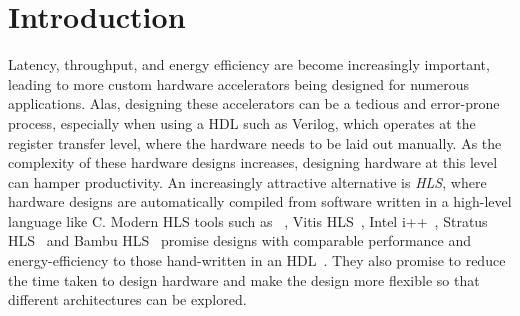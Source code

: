 \chapter{Introduction}%
\label{sec:introduction}




Latency, throughput, and energy efficiency are become increasingly important,
leading to more custom hardware accelerators being designed for numerous
applications.  Alas, designing these accelerators can be a tedious and
error-prone process, especially when using a \gls{HDL} such as Verilog, which
operates at the register transfer level, where the hardware needs to be laid out
manually.  As the complexity of these hardware designs increases, designing
hardware at this level can hamper productivity.  An increasingly attractive
alternative is \emph{\gls{HLS}}, where hardware designs are automatically
compiled from software written in a high-level language like C.  Modern
\gls{HLS} tools such as \legup{}~\cite{canis11_legup}, Vitis
HLS~\cite{amd23_vitis_high_synth}, Intel i++~\cite{intel_hls}, Stratus
HLS~\cite{roane23_autom_hw_sw_co_desig} and Bambu HLS~\cite{bambu_hls} promise
designs with comparable performance and energy-efficiency to those hand-written
in an \gls{HDL}~\cite{homsirikamol+14, silexicahlshdl, 7818341}.  They also
promise to reduce the time taken to design hardware and make the design more
flexible so that different architectures can be explored.

